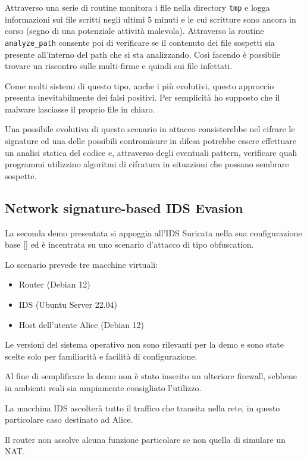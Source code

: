 \documentclass{ldr-article}
\begin{document}
Attraverso una serie di routine monitora i file nella directory \texttt{tmp} e logga informazioni sui file scritti negli ultimi 5 minuti e le cui scritture sono ancora in corso (segno di una potenziale attività malevola). Attraverso la routine \texttt{analyze\_path} consente poi di verificare se il contenuto dei file sospetti sia presente all'interno del path che si sta analizzando. Così facendo è possibile trovare un riscontro sulle multi-firme e quindi sui file infettati.

Come molti sistemi di questo tipo, anche i più evolutivi, questo approccio presenta inevitabilmente dei falsi positivi. Per semplicità ho supposto che il malware lasciasse il proprio file in chiaro.

Una possibile evolutiva di questo scenario in attacco consisterebbe nel cifrare le signature ed una delle possibili contromisure in difesa potrebbe essere effettuare un analisi statica del codice e, attraverso degli eventuali pattern, verificare quali programmi utilizzino algoritmi di cifratura in situazioni che possano sembrare sospette.

\subsection{Network signature-based IDS Evasion}
La seconda demo presentata si appoggia all'IDS Suricata nella sua configurazione base [\cite{suricata-getting-started}] ed è incentrata su uno scenario d'attacco di tipo obfuscation.

Lo scenario prevede tre macchine virtuali:

\begin{itemize}
  \item Router (Debian 12)
  \item IDS (Ubuntu Server 22.04)
  \item Host dell'utente Alice (Debian 12)
\end{itemize}

Le versioni del sistema operativo non sono rilevanti per la demo e sono state scelte solo per familiarità e facilità di configurazione.

Al fine di semplificare la demo non è stato inserito un ulteriore firewall, sebbene in ambienti reali sia ampiamente consigliato l'utilizzo.

La macchina IDS ascolterà tutto il traffico che transita nella rete, in questo particolare caso destinato ad Alice.

Il router non assolve alcuna funzione particolare se non quella di simulare un NAT.
\end{document}
